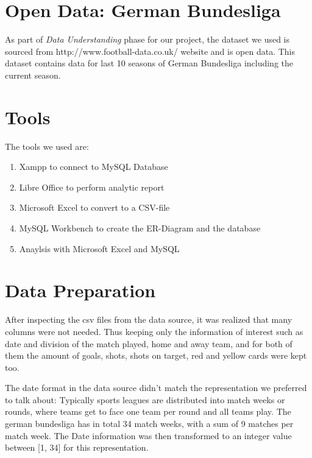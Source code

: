 \documentclass[11pt, journal]{IEEEtran}
\begin{document}
\section{Open Data: German Bundesliga } \label{sec:dataunderstanding}
As part of \emph{Data Understanding}  phase for our project, the dataset we used is sourced from http://www.football-data.co.uk/ website and is open data. This dataset contains data for last 10 seasons of German Bundesliga including the current season.
\section{Tools} \label{sec:concept}
The tools we used are: 
\begin{enumerate}
\item Xampp to connect to MySQL Database
\item Libre Office to perform analytic report
\item Microsoft Excel to convert to a CSV-file
\item MySQL Workbench to create the ER-Diagram and the database
\item Anaylsis with Microsoft Excel and MySQL
\end{enumerate}
 
\section{Data Preparation} \label{sec:impl}
After inspecting the csv files from the data source, it was realized that many columns were not needed. Thus keeping only
the information of interest such as date and division of the match played, home and away team, and for both of them the amount of goals,
shots, shots on target, red and yellow cards were kept too.

The date format in the data source didn't match the representation we preferred to talk about: Typically sports leagues are distributed into 
match weeks or rounds, where teams get to face one team per round and all teams play. The german bundesliga has in total 34 match weeks, with a
sum of 9 matches per match week. The Date information was then transformed to an integer value between [1, 34] for this representation.
\end{document}
